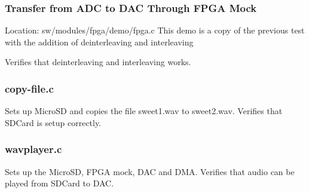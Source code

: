 \subsubsection{Transfer from ADC to DAC Through FPGA Mock}
Location: sw/modules/fpga/demo/fpga.c
This demo is a copy of the previous test with the addition of deinterleaving and interleaving


Verifies that deinterleaving and interleaving works.

\subsubsection{copy-file.c}
Sets up MicroSD and copies the file sweet1.wav to sweet2.wav.
Verifies that SDCard is setup correctly.

\subsubsection{wavplayer.c}
Sets up the MicroSD, FPGA mock, DAC and DMA.
Verifies that audio can be played from SDCard to DAC.
